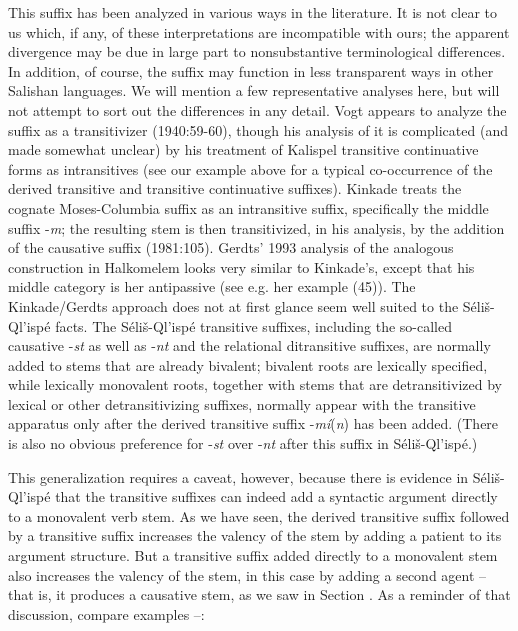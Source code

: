 \documentclass[output=paper,colorlinks,citecolor=brown]{langscibook}
\begin{document}
This suffix has been analyzed in various ways in the literature.  It
is not clear to us which, if any, of these interpretations are
incompatible with ours; the apparent divergence may be due in large
part to nonsubstantive terminological differences.  In addition, of
course, the suffix may function in less transparent ways in other
Salishan languages.  We will mention a few representative analyses
here, but will not attempt to sort out the differences in any detail.
Vogt appears to analyze the suffix as a transitivizer (1940:59-60),
though his analysis of it is complicated (and made somewhat unclear)
by his treatment of Kalispel transitive continuative forms as
intransitives (see our example  above for a typical co-occurrence of the
derived transitive and transitive continuative suffixes).  Kinkade
treats the cognate Moses-Columbia suffix as an intransitive suffix,
specifically the middle suffix -\emph{m}; the resulting stem is then
transitivized, in his analysis, by the addition of the causative
suffix (1981:105).  Gerdts' 1993 analysis of the analogous
construction in Halkomelem looks very similar to Kinkade's, except
that his middle category is her antipassive (see e.g. her example (45)).
The Kinkade/Gerdts approach does not at first glance seem well suited
to the S\'eli\v{s}-Ql'isp\'e facts.  The S\'eli\v{s}-Ql'isp\'e
transitive suffixes, including the so-called causative -\emph{st} as
well as -\emph{nt} and the relational ditransitive suffixes, are normally
added to stems that are already bivalent; bivalent roots are
lexically specified, while lexically monovalent roots, together with
stems that are detransitivized by lexical or other detransitivizing
suffixes, normally appear with the transitive apparatus only after the
derived transitive suffix -\emph{m\'i}(\emph{n}) has been added.  (There
is also no obvious preference for -\emph{st} over -\emph{nt} after this
suffix in S\'eli\v{s}-Ql'isp\'e.)


This generalization requires a caveat, however, because there is
evidence in S\'eli\v{s}-Ql'isp\'e that the transitive suffixes can
indeed add a syntactic argument directly to a monovalent verb stem.
As we have seen, the derived transitive suffix followed by a
transitive suffix increases the valency of the stem by adding a
patient to its argument structure.  But a transitive suffix added
directly to a monovalent stem also increases the valency of the stem,
in this case by adding a second agent -- that is, it produces a
causative stem, as we saw in Section .  As a reminder of that
discussion, compare examples --:
\end{document}
